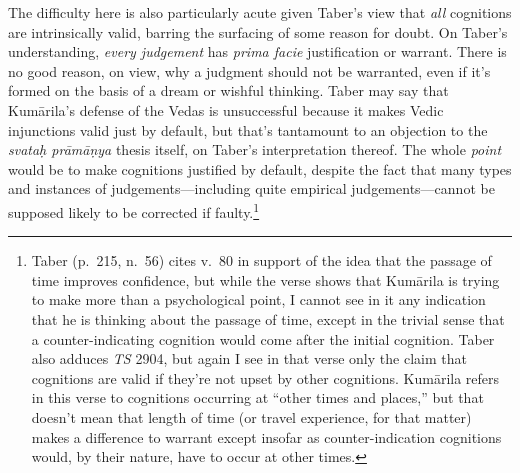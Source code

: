 ﻿\documentclass[11pt]{amsart}
\begin{document}
The difficulty here is also particularly acute given Taber's view that \emph{all} cognitions are intrinsically valid, barring the surfacing of some reason for doubt. On Taber's understanding, \emph{every judgement} has \emph{prima facie} justification or warrant. There is no good reason, on view, why a judgment should not be warranted, even if it's formed on the basis of a dream or wishful thinking. Taber may say that Kum\=arila's defense of the Vedas is unsuccessful because it makes Vedic injunctions valid just by default, but that's tantamount to an objection to the \emph{svata\d h pr\=am\=a\d nya} thesis itself, on Taber's interpretation thereof. The whole \emph{point} would be to make cognitions justified by default, despite the fact that many types and instances of judgements---including quite empirical judgements---cannot be supposed likely to be corrected if faulty.\footnote{Taber (p.~215, n.~56) cites v.~80 in support of the idea that the passage of time improves confidence, but while the verse shows that Kum\=arila is trying to make more than a psychological point, I cannot see in it any indication that he is thinking about the passage of time, except in the trivial sense that a counter-indicating cognition would come after the initial cognition. Taber also adduces \emph{TS} 2904, but again I see in that verse only the claim that cognitions are valid if they're not upset by other cognitions. Kum\=arila refers in this verse to cognitions occurring at ``other times and places,'' but that doesn't mean that length of time (or travel experience, for that matter) makes a difference to warrant except insofar as counter-indication cognitions would, by their nature, have to occur at other times.\label{tabertextual}}
\end{document}
